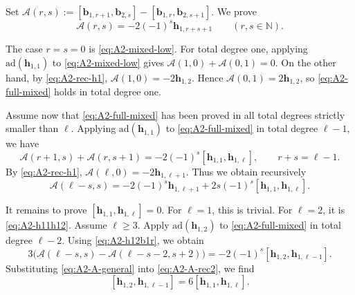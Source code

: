 \documentclass[11pt,reqno]{amsart}
\numberwithin{equation}{section}
\theoremstyle{definition}
\theoremstyle{remark}
\newcommand{\bN}{\mathbb{N}}
\newcommand{\bb}{\mathbf{b}}
\newcommand{\bh}{\mathbf{h}}
\newcommand{\gge}{\geqslant}
\newcommand{\ad}{\mathrm{ad}}
\begin{document}
Set $\mathscr A(r,s)
:=
[\bb_{1,r+1},\bb_{2,s}]-[\bb_{1,r},\bb_{2,s+1}]$.
We prove
\begin{equation}\label{eq:A2-full-mixed}
\mathscr A(r,s)
=
-2(-1)^s\bh_{1,r+s+1}
\qquad
(r,s\in\bN).
\end{equation}

The case $r=s=0$ is
\eqref{eq:A2-mixed-low}.  For total degree one,
applying $\ad(\bh_{1,1})$ to
\eqref{eq:A2-mixed-low} gives
$\mathscr A(1,0)+\mathscr A(0,1)=0$. On the other hand, by \eqref{eq:A2-rec-h1}, $\mathscr A(1,0)=-2\bh_{1,2}$.
Hence $\mathscr A(0,1)=2\bh_{1,2}$,
so \eqref{eq:A2-full-mixed} holds in total degree one.

Assume now that \eqref{eq:A2-full-mixed} has been proved in all total
degrees strictly smaller than $\ell$. 
Applying $\ad(\bh_{1,1})$ to
\eqref{eq:A2-full-mixed} in total degree $\ell-1$, we have
\begin{equation*}
\mathscr A(r+1,s)+\mathscr A(r,s+1)
=
-2(-1)^s[\bh_{1,1},\bh_{1,\ell}],
\qquad
r+s=\ell-1.
\end{equation*}
By \eqref{eq:A2-rec-h1}, $\mathscr A(\ell,0)=-2\bh_{1,\ell+1}$. Thus we obtain recursively
\begin{equation}\label{eq:A2-A-general}
\mathscr A(\ell-s,s)
=
-2(-1)^s\bh_{1,\ell+1}
+
2s(-1)^s[\bh_{1,1},\bh_{1,\ell}].
\end{equation}

It remains to prove $[\bh_{1,1},\bh_{1,\ell}]=0$.  For $\ell=1$, this is trivial.
For $\ell=2$, it is \eqref{eq:A2-h11h12}.  Assume $\ell\gge3$. Apply $\ad(\bh_{1,2})$ to
\eqref{eq:A2-full-mixed} in total degree $\ell-2$.  Using
\eqref{eq:A2-h12b1r}, we obtain
\begin{equation}\label{eq:A2-A-rec2}
3\bigl(\mathscr A(\ell-s,s)-\mathscr A(\ell-s-2,s+2)\bigr)
=
-2(-1)^s[\bh_{1,2},\bh_{1,\ell-1}].
\end{equation}
Substituting \eqref{eq:A2-A-general} into \eqref{eq:A2-A-rec2}, we find
\begin{equation}\label{eq:A2-h12hm-first}
[\bh_{1,2},\bh_{1,\ell-1}]
=
6[\bh_{1,1},\bh_{1,\ell}].
\end{equation}
\end{document}
